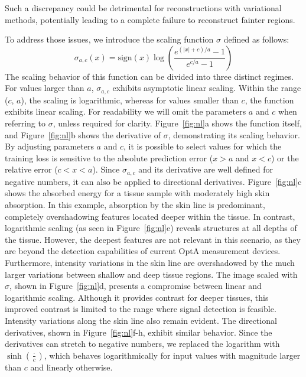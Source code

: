 \documentclass[journal,twoside,web]{ieeecolor}
\begin{document}
Such a discrepancy could be detrimental for reconstructions with variational methods, potentially leading to a complete failure to reconstruct fainter regions. %
\par
To address those issues, we introduce the scaling function $\sigma$ defined as follows:
\begin{equation}
    \sigma_{a, c}(x) = \text{sign}(x)\log\left(\frac{e^{(\vert x \vert + c) / a} - 1}{e^{c/a} - 1}\right)
    \label{eq:nl}
\end{equation}
The scaling behavior of this function can be divided into three distinct regimes. %
For values larger than $a$, $\sigma_{a, c}$ exhibits asymptotic linear scaling. %
Within the range ($c$, $a$), the scaling is logarithmic, whereas for values smaller than $c$, the function exhibits linear scaling. %
For readability we will omit the parameters $a$ and $c$ when referring to $\sigma$, unless required for clarity. %
Figure~\ref{fig:nl}a shows the function itself, and Figure~\ref{fig:nl}b shows the derivative of $\sigma$, demonstrating its scaling behavior. %
By adjusting parameters $a$ and $c$, it is possible to select values for which the training loss is sensitive to the absolute prediction error ($x>a$ and $x<c$) or the relative error ($c<x<a$). %
Since $\sigma_{a, c}$ and its derivative are well defined for negative numbers, it can also be applied to directional derivatives. %
Figure~\ref{fig:nl}c shows the absorbed energy for a tissue sample with moderately high skin absorption. %
In this example, absorption by the skin line is predominant, completely overshadowing features located deeper within the tissue. %
In contrast, logarithmic scaling (as seen in Figure~\ref{fig:nl}e) reveals structures at all depths of the tissue. %
However, the deepest features are not relevant in this scenario, as they are beyond the detection capabilities of current OptA measurement devices. %
Furthermore, intensity variations in the skin line are overshadowed by the much larger variations between shallow and deep tissue regions. %
The image scaled with $\sigma$, shown in Figure~\ref{fig:nl}d, presents a compromise between linear and logarithmic scaling. %
Although it provides contrast for deeper tissues, this improved contrast is limited to the range where signal detection is feasible.
Intensity variations along the skin line also remain evident. %
The directional derivatives, shown in Figure~\ref{fig:nl}f-h, exhibit similar behavior. %
Since the derivatives can stretch to negative numbers, we replaced the logarithm with $\sinh\left(\frac{\cdot}{c}\right)$, which behaves logarithmically for input values with magnitude larger than $c$ and linearly otherwise. %
\end{document}
